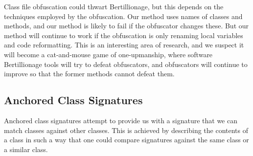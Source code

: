 Class file obfuscation could thwart Bertillionage, but this depends on the
techniques employed by the obfuscation. Our method uses names of
classes and methods, and our method is likely to fail if the
obfuscator changes these. But our method will continue to work if the
obfuscation is only renaming local variables and code reformatting. This is
an interesting area of research, and we suspect it will become a
cat-and-mouse game of one-upmanship, where software Bertillionage tools will try to
defeat obfuscators, and obfuscators will continue to improve so that
the 
former methods cannot defeat them.


\subsection{Anchored Class Signatures}
\label{sec:anchored}


Anchored class signatures attempt to provide us with a signature that
we can match classes against other classes. This is achieved by
describing the contents of a class in such a way that one could
compare signatures against the same class or a similar class.


